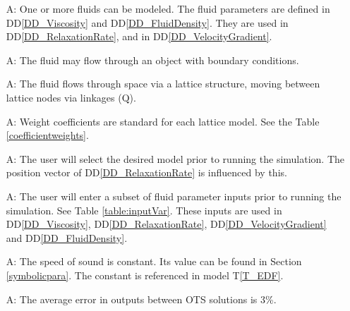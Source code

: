 \documentclass[12pt]{article}
\newcommand{\tref}[1]{T\ref{#1}}
\newcounter{assumpnum} %
\begin{document}
\begin{itemize}

\item[A\refstepcounter{assumpnum}\theassumpnum \label{A_fluids}:]
  One or more fluids can be modeled. The fluid parameters are defined in DD\ref{DD_Viscosity} and DD\ref{DD_FluidDensity}. They are used in DD\ref{DD_RelaxationRate}, and in DD\ref{DD_VelocityGradient}.
  
\item[A\refstepcounter{assumpnum}\theassumpnum \label{A_flowObject}:]
  The fluid may flow through an object with boundary conditions.
  
\item[A\refstepcounter{assumpnum}\theassumpnum \label{A_lattice}:]
  The fluid flows through space via a lattice structure, moving between lattice nodes via linkages ($\mathrm{Q}$).
  
\item[A\refstepcounter{assumpnum}\theassumpnum \label{A_weightCoefficients}:]
  Weight coefficients are standard for each lattice model. See the Table \ref{coefficientweights}.

\item[A\refstepcounter{assumpnum}\theassumpnum \label{A_selectModel}:]
  The user will select the desired model prior to running the simulation. The position vector of DD\ref{DD_RelaxationRate} is influenced by this.

\item[A\refstepcounter{assumpnum}\theassumpnum \label{A_userInputs}:]
  The user will enter a subset of fluid parameter inputs prior to running the simulation. See Table \ref{table:inputVar}. These inputs are used in DD\ref{DD_Viscosity}, DD\ref{DD_RelaxationRate}, DD\ref{DD_VelocityGradient} and DD\ref{DD_FluidDensity}.
  
\item[A\refstepcounter{assumpnum}\theassumpnum \label{A_speedSound}:]
  The speed of sound is constant. Its value can be found in Section \ref{symbolicpara}. The constant is referenced in model \tref{T_EDF}.   
  
\item[A\refstepcounter{assumpnum}\theassumpnum \label{A_AVGERROR}:]
  The average error in outputs between OTS solutions is 3\%.   

\end{itemize}
\end{document}
